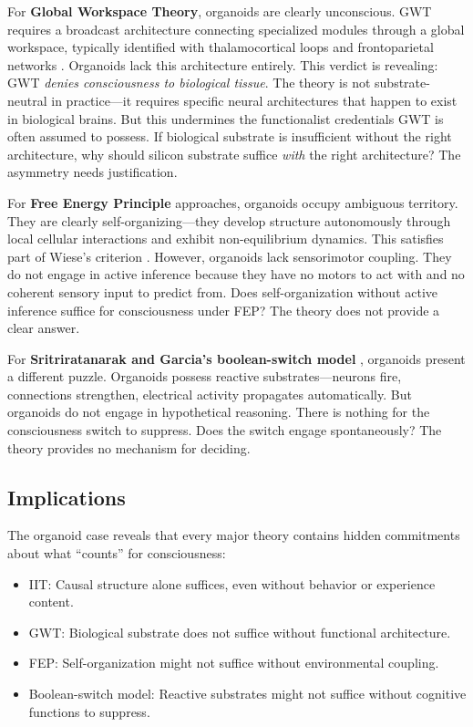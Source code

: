 For \textbf{Global Workspace Theory}, organoids are clearly unconscious. GWT requires a
broadcast architecture connecting specialized modules through a global workspace, typically
identified with thalamocortical loops and frontoparietal networks \cite{baars1988cognitive,
dehaene2014toward}. Organoids lack this architecture entirely. This verdict is revealing:
GWT \emph{denies consciousness to biological tissue}. The theory is not substrate-neutral
in practice---it requires specific neural architectures that happen to exist in biological
brains. But this undermines the functionalist credentials GWT is often assumed to possess.
If biological substrate is insufficient without the right architecture, why should silicon
substrate suffice \emph{with} the right architecture? The asymmetry needs justification.

For \textbf{Free Energy Principle} approaches, organoids occupy ambiguous territory. They are
clearly self-organizing---they develop structure autonomously through local cellular
interactions and exhibit non-equilibrium dynamics. This satisfies part of Wiese's criterion
\cite{wiese2024fep}. However, organoids lack sensorimotor coupling. They do not engage in
active inference because they have no motors to act with and no coherent sensory input to
predict from. Does self-organization without active inference suffice for consciousness under
FEP? The theory does not provide a clear answer.

For \textbf{Sritriratanarak and Garcia's boolean-switch model} \cite{sritriratanarak2025consciousness},
organoids present a different puzzle. Organoids possess reactive substrates---neurons fire,
connections strengthen, electrical activity propagates automatically. But organoids do not
engage in hypothetical reasoning. There is nothing for the consciousness switch to suppress.
Does the switch engage spontaneously? The theory provides no mechanism for deciding.

\subsection{Implications}

The organoid case reveals that every major theory contains hidden commitments about what
``counts'' for consciousness:

\begin{itemize}[leftmargin=2em]
\item IIT: Causal structure alone suffices, even without behavior or experience content.
\item GWT: Biological substrate does not suffice without functional architecture.
\item FEP: Self-organization might not suffice without environmental coupling.
\item Boolean-switch model: Reactive substrates might not suffice without cognitive functions
      to suppress.
\end{itemize}

